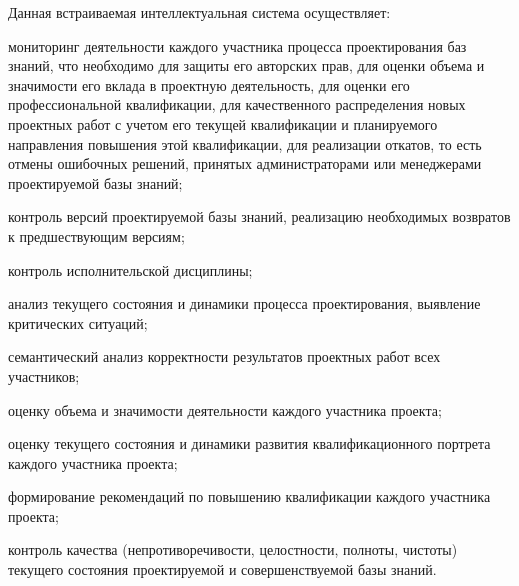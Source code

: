\begin{SCn}
{Данная встраиваемая интеллектуальная система осуществляет:
\begin{scnitemize}
    \item мониторинг деятельности каждого участника процесса проектирования баз знаний, что необходимо для защиты его авторских прав, для оценки объема и значимости его вклада в проектную деятельность, для оценки его профессиональной квалификации, для качественного распределения новых проектных работ с учетом его текущей квалификации и планируемого направления повышения этой квалификации, для реализации откатов, то есть отмены ошибочных решений, принятых администраторами или менеджерами проектируемой базы знаний;
    \item контроль версий проектируемой базы знаний, реализацию необходимых возвратов к предшествующим версиям;
    \item контроль исполнительской дисциплины;
    \item анализ текущего состояния и динамики процесса проектирования, выявление критических ситуаций;
    \item семантический анализ корректности результатов проектных работ всех участников;
    \item оценку объема и значимости деятельности каждого участника проекта;
    \item оценку текущего состояния и динамики развития квалификационного портрета каждого участника проекта;
    \item формирование рекомендаций по повышению квалификации каждого участника проекта;
    \item контроль качества (непротиворечивости, целостности, полноты, чистоты) текущего состояния проектируемой и совершенствуемой базы знаний.
\end{scnitemize}

}
\end{SCn}
